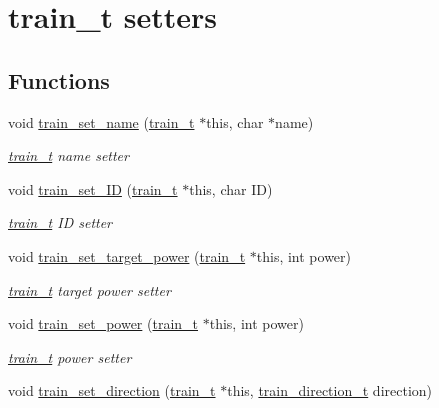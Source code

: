 \hypertarget{group__train__t__setters}{\section{train\-\_\-t setters}
\label{group__train__t__setters}
}
\subsection*{Functions}
\begin{DoxyCompactItemize}
\item 
void \hyperlink{group__train__t__setters_gae4e9409d5a7efef09d9a8b56b08ef1f8}{train\-\_\-set\-\_\-name} (\hyperlink{structtrain__t}{train\-\_\-t} $\ast$this, char $\ast$name)
\begin{DoxyCompactList}\small\item\em \hyperlink{structtrain__t}{train\-\_\-t} name setter \end{DoxyCompactList}\item 
void \hyperlink{group__train__t__setters_ga3c469c2cc8f39cee7c71e8f73db9f644}{train\-\_\-set\-\_\-\-I\-D} (\hyperlink{structtrain__t}{train\-\_\-t} $\ast$this, char I\-D)
\begin{DoxyCompactList}\small\item\em \hyperlink{structtrain__t}{train\-\_\-t} I\-D setter \end{DoxyCompactList}\item 
void \hyperlink{group__train__t__setters_gadf26e57aef5ad40b3caf4ef3a3e5b7e5}{train\-\_\-set\-\_\-target\-\_\-power} (\hyperlink{structtrain__t}{train\-\_\-t} $\ast$this, int power)
\begin{DoxyCompactList}\small\item\em \hyperlink{structtrain__t}{train\-\_\-t} target power setter \end{DoxyCompactList}\item 
void \hyperlink{group__train__t__setters_ga38ca05d656a7d8b84cb7b6e8022b6d62}{train\-\_\-set\-\_\-power} (\hyperlink{structtrain__t}{train\-\_\-t} $\ast$this, int power)
\begin{DoxyCompactList}\small\item\em \hyperlink{structtrain__t}{train\-\_\-t} power setter \end{DoxyCompactList}\item 
void \hyperlink{group__train__t__setters_ga03b2f44c10f4d4c9e89743e7403eef6f}{train\-\_\-set\-\_\-direction} (\hyperlink{structtrain__t}{train\-\_\-t} $\ast$this, \hyperlink{group__train__t__structs_gae1037d4e4a5a1fe1c4bbe139091ef3a2}{train\-\_\-direction\-\_\-t} direction)

\end{DoxyCompactItemize}
